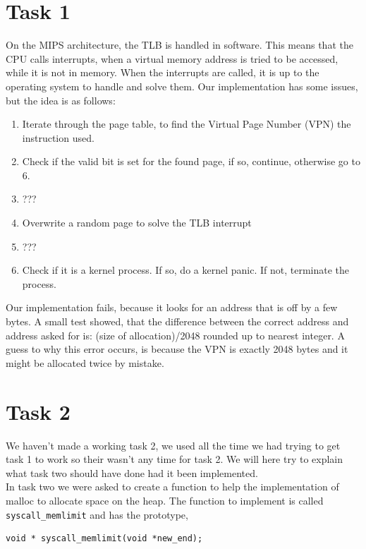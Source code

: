 \documentclass[11pt]{article}
\begin{document}
\section*{Task 1}
On the MIPS architecture, the TLB is handled in software. This means that the CPU calls interrupts, when a virtual memory address is tried to be accessed, while it is not in memory. When the interrupts are called, it is up to the operating system to handle and solve them.
Our implementation has some issues, but the idea is as follows: 
\begin{enumerate}
    \item Iterate through the page table, to find the Virtual Page Number (VPN) the instruction used.
    \item Check if the valid bit is set for the found page, if so, continue, otherwise go to 6.
    \item ???
    \item Overwrite a random page to solve the TLB interrupt
    \item ???
    \item Check if it is a kernel process. If so, do a kernel panic. If not, terminate the process.
\end{enumerate}

Our implementation fails, because it looks for an address that is off by a few bytes. A small test showed, that the difference between the correct address and address asked for is: (size of allocation)/2048 rounded up to nearest integer. A guess to why this error occurs, is because the VPN is exactly 2048 bytes and it might be allocated twice by mistake.

\section*{Task 2}
    We haven't made a working task 2, we used all the time we had trying to get
    task 1 to work so their wasn't any time for task 2.  We will here try to
    explain what task two should have done had it been implemented. \\

    In task two we were asked to create a function to help the implementation of
    malloc to allocate space on the heap.  The function to implement is called
    \texttt{syscall\_memlimit} and has the prototype,

    \begin{lstlisting}[style=customc]
void * syscall_memlimit(void *new_end);
    \end{lstlisting}
\end{document}
